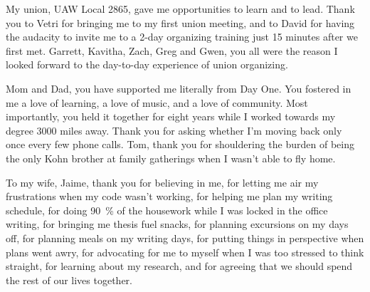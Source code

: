 \begin{acknowledgements}
    My union, UAW Local 2865, gave me opportunities to learn and to lead.
    Thank you to Vetri for bringing me to my first union meeting, and
    to David for having the audacity to invite me to a 2-day organizing training
    just 15 minutes after we first met.
    Garrett, Kavitha, Zach, Greg and Gwen, you all were the reason
    I looked forward to the day-to-day experience of union organizing.

    Mom and Dad, you have supported me literally from Day One.
    You fostered in me a love of learning, a love of music,
    and a love of community.
    Most importantly, you held it together for eight years
    while I worked towards my degree 3000 miles away.
    Thank you for asking whether I'm moving back only once every few phone calls.
    Tom, thank you for shouldering the burden of being the only Kohn brother
    at family gatherings when I wasn't able to fly home.

    To my wife, Jaime, thank you for believing in me,
    for letting me air my frustrations when my code wasn't working,
    for helping me plan my writing schedule,
    for doing \SI{90}{\percent} of the housework while I was
    locked in the office writing,
    for bringing me thesis fuel snacks,
    for planning excursions on my days off,
    for planning meals on my writing days,
    for putting things in perspective when plans went awry,
    for advocating for me to myself when I was too stressed to think straight,
    for learning about my research,
    and for agreeing that we should spend the rest of our lives together.




\end{acknowledgements}

